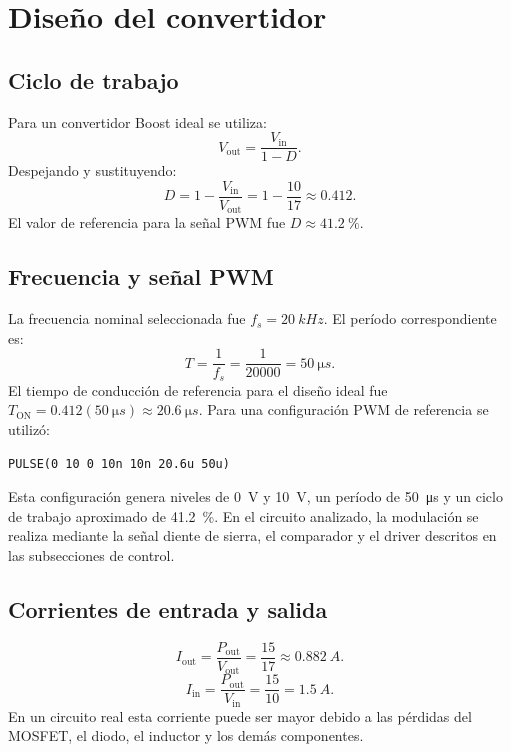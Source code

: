 \documentclass[12pt]{article}
\begin{document}
\section{Diseño del convertidor}
\subsection{Ciclo de trabajo}
Para un convertidor Boost ideal se utiliza:
\begin{equation}
V_{\mathrm{out}}=\frac{V_{\mathrm{in}}}{1-D}.
\label{eq:boost}
\end{equation}
Despejando y sustituyendo:
\begin{equation}
D=1-\frac{V_{\mathrm{in}}}{V_{\mathrm{out}}}=1-\frac{10}{17}\approx0.412.
\label{eq:duty}
\end{equation}
El valor de referencia para la señal PWM fue $D\approx\SI{41.2}{\percent}$.

\subsection{Frecuencia y señal PWM}
La frecuencia nominal seleccionada fue $f_s=\SI{20}{kHz}$. El período correspondiente es:
\begin{equation}
T=\frac{1}{f_s}=\frac{1}{20000}=\SI{50}{\micro s}.
\label{eq:periodo}
\end{equation}
El tiempo de conducción de referencia para el diseño ideal fue $T_{\mathrm{ON}}=0.412(\SI{50}{\micro s})\approx\SI{20.6}{\micro s}$. Para una configuración PWM de referencia se utilizó:
\begin{verbatim}
PULSE(0 10 0 10n 10n 20.6u 50u)
\end{verbatim}
Esta configuración genera niveles de \SI{0}{V} y \SI{10}{V}, un período de \SI{50}{\micro s} y un ciclo de trabajo aproximado de \SI{41.2}{\percent}. En el circuito analizado, la modulación se realiza mediante la señal diente de sierra, el comparador y el driver descritos en las subsecciones de control.

\subsection{Corrientes de entrada y salida}
\begin{equation}
I_{\mathrm{out}}=\frac{P_{\mathrm{out}}}{V_{\mathrm{out}}}=\frac{15}{17}\approx\SI{0.882}{A}.
\label{eq:iout}
\end{equation}
\begin{equation}
I_{\mathrm{in}}=\frac{P_{\mathrm{out}}}{V_{\mathrm{in}}}=\frac{15}{10}=\SI{1.5}{A}.
\label{eq:iin}
\end{equation}
En un circuito real esta corriente puede ser mayor debido a las pérdidas del MOSFET, el diodo, el inductor y los demás componentes.
\end{document}
